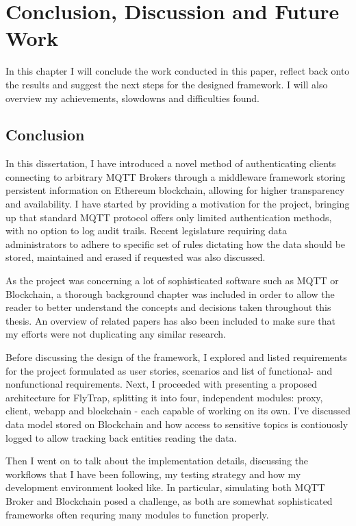 \chapter{Conclusion, Discussion and Future Work\label{chap:discussion}}
In this chapter I will conclude the work conducted in this paper, reflect back onto the results and suggest the next steps for the designed framework. I will also overview my achievements, slowdowns and difficulties found.

\section{Conclusion}
In this dissertation, I have introduced a novel method of authenticating clients connecting to arbitrary MQTT Brokers through a middleware framework storing persistent information on Ethereum blockchain, allowing for higher transparency and availability. I have started by providing a motivation for the project, bringing up that standard MQTT protocol offers only limited authentication methods, with no option to log audit trails. Recent legislature requiring data administrators to adhere to specific set of rules dictating how the data should be stored, maintained and erased if requested was also discussed.

As the project was concerning a lot of sophisticated software such as MQTT or Blockchain, a thorough background chapter was included in order to allow the reader to better understand the concepts and decisions taken throughout this thesis. An overview of related papers has also been included to make sure that my efforts were not duplicating any similar research.

Before discussing the design of the framework, I explored and listed requirements for the project formulated as user stories, scenarios and list of functional- and nonfunctional requirements. Next, I proceeded with presenting a proposed architecture for FlyTrap, splitting it into four, independent modules: proxy, client, webapp and blockchain - each capable of working on its own. I've discussed data model stored on Blockchain and how access to sensitive topics is contiouosly logged to allow tracking back entities reading the data.

Then I went on to talk about the implementation details, discussing the workflows that I have been following, my testing strategy and how my development environment looked like. In particular, simulating both MQTT Broker and Blockchain posed a challenge, as both are somewhat sophisticated frameworks often requring many modules to function properly.

